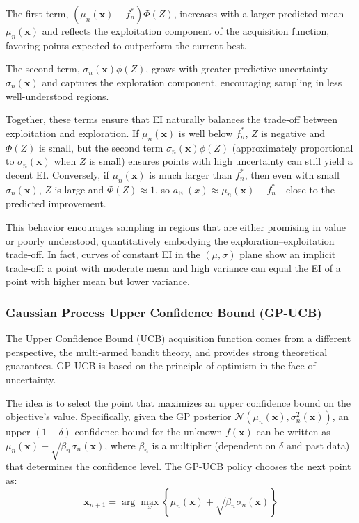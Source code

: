 \documentclass{ut-thesis}
\begin{document}
The first term, $(\mu_n(\mathbf{x}) - f^*_n)\Phi(Z)$, increases with a larger predicted mean $\mu_n(\mathbf{x})$ and reflects the exploitation component of the acquisition function, favoring points expected to outperform the current best. 

The second term, $\sigma_n(\mathbf{x})\phi(Z)$, grows with greater predictive uncertainty $\sigma_n(\mathbf{x})$ and captures the exploration component, encouraging sampling in less well-understood regions. 

Together, these terms ensure that EI naturally balances the trade-off between exploitation and exploration. If $\mu_n(\mathbf{x})$ is well below $f^*_n$, $Z$ is negative and $\Phi(Z)$ is small, but the second term $\sigma_n(\mathbf{x})\phi(Z)$ (approximately proportional to $\sigma_n(\mathbf{x})$ when $Z$ is small) ensures points with high uncertainty can still yield a decent EI. Conversely, if $\mu_n(\mathbf{x})$ is much larger than $f^*_n$, then even with small $\sigma_n(\mathbf{x})$, $Z$ is large and $\Phi(Z) \approx 1$, so $a_{\mathrm{EI}}(x) \approx \mu_n(\mathbf{x}) - f^*_n$—close to the predicted improvement.

This behavior encourages sampling in regions that are either promising in value or poorly understood, quantitatively embodying the exploration–exploitation trade-off. In fact, curves of constant EI in the $(\mu, \sigma)$ plane show an implicit trade-off: a point with moderate mean and high variance can equal the EI of a point with higher mean but lower variance.

\subsubsection{Gaussian Process Upper Confidence Bound (GP-UCB)}

The Upper Confidence Bound (UCB) acquisition function comes from a different perspective, the multi-armed bandit theory, and provides strong theoretical guarantees. GP-UCB is based on the principle of optimism in the face of uncertainty. 

The idea is to select the point that maximizes an upper confidence bound on the objective's value. Specifically, given the GP posterior $\mathcal{N}(\mu_n(\mathbf{x}), \sigma_n^2(\mathbf{x}))$, an upper $(1 - \delta)$-confidence bound for the unknown $f(\mathbf{x})$ can be written as $\mu_n(\mathbf{x}) + \sqrt{\beta_n}\sigma_n(\mathbf{x})$, where $\beta_n$ is a multiplier (dependent on $\delta$ and past data) that determines the confidence level. The GP-UCB policy chooses the next point as:
\begin{equation}
    \mathbf{x}_{n+1} = \arg\max_x \left\{ \mu_n(\mathbf{x}) + \sqrt{\beta_n}\sigma_n(\mathbf{x}) \right\}
\end{equation}
\end{document}
